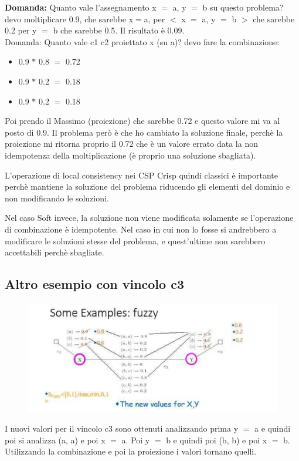 \textbf{Domanda:} Quanto vale l’assegnamento x $=$ a, y $=$ b su questo problema? 
\\devo moltiplicare 0.9, che sarebbe x$=$a, per $<$ x $=$ a, y $=$ b $>$ che sarebbe 0.2 per y $=$ b che sarebbe 0.5. Il risultato è 0.09.
\\Domanda: Quanto vale c1 c2 proiettato x (su a)? devo fare la combinazione:
\begin{itemize}
    \item 0.9 $*$ 0.8 $=$ 0.72
    \item 0.9 $*$ 0.2 $=$ 0.18
    \item 0.9 $*$ 0.2 $=$ 0.18
\end{itemize}
Poi prendo il Massimo (proiezione) che sarebbe 0.72 e questo valore mi va al posto di 0.9. Il problema però è che ho cambiato la soluzione finale, perchè la proiezione mi ritorna proprio il 0.72 che è un valore errato data la non idempotenza della moltiplicazione (è proprio una soluzione sbagliata).

\vspace{0.8cm}

L’operazione di local consistency nei CSP Crisp quindi classici è importante perchè mantiene la soluzione del problema riducendo gli elementi del dominio e non modificando le soluzioni.

\vspace{0.5cm}

Nel caso Soft invece, la soluzione non viene modificata solamente se l’operazione di combinazione è idempotente. Nel caso in cui non lo fosse si andrebbero a modificare le soluzioni stesse del problema, e quest’ultime non sarebbero accettabili perchè sbagliate.
\newpage
\subsection{Altro esempio con vincolo c3}
\begin{figure}[htp]
	\centering
    \includegraphics[width=12cm, keepaspectratio]{img/Cap5/fuzzy2.png}
\end{figure}
I nuovi valori per il vincolo c3 sono ottenuti analizzando prima y $=$ a e quindi poi si analizza (a, a) e poi x $=$ a. Poi y $=$ b e quindi poi (b, b) e poi x $=$ b. Utilizzando la combinazione e poi la proiezione i valori tornano quelli.
